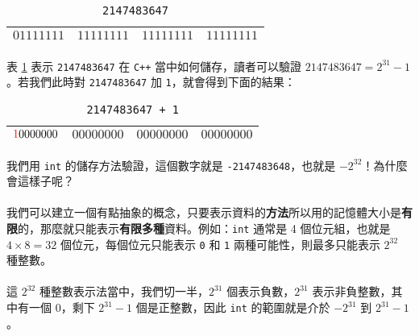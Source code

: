 \documentclass[12pt,a4paper,oneside]{article}
\begin{document}
\begin{CJK}{UTF8}{bkai}
\begin{table}[h!]
\centering
\begin{tabular}{|c|c|c|c|}
\hline
$01111111$ & $11111111$ & $11111111$ & $11111111$\\
\hline
\end{tabular}
\caption{\lstinline!2147483647!}
\label{program:struct:table:binary:2147483647}
\end{table}

\paragraph{}表 \ref{program:struct:table:binary:2147483647} 表示 \lstinline!2147483647! 在 \texttt{C++} 當中如何儲存，讀者可以驗證 $2147483647=2^{31}-1$。若我們此時對 \lstinline!2147483647! 加 \lstinline!1!，就會得到下面的結果：

\begin{table}[h!]
\centering
\begin{tabular}{|c|c|c|c|}
\hline
${\color{red}1}0000000$ & $00000000$ & $00000000$ & $00000000$\\
\hline
\end{tabular}
\caption{\lstinline!2147483647 + 1!}
\end{table}

\paragraph{}我們用 \lstinline!int! 的儲存方法驗證，這個數字就是 \lstinline!-2147483648!，也就是 $-2^{32}$！為什麼會這樣子呢？
\paragraph{}我們可以建立一個有點抽象的概念，只要表示資料的\textbf{方法}所以用的記憶體大小是\textbf{有限}的，那麼就只能表示\textbf{有限多種}資料。例如：\lstinline!int! 通常是 4 個位元組，也就是 $4\times{8}=32$ 個位元，每個位元只能表示 \lstinline!0! 和 \lstinline!1! 兩種可能性，則最多只能表示 $2^{32}$ 種整數。
\paragraph{}這 $2^{32}$ 種整數表示法當中，我們切一半，$2^{31}$ 個表示負數，$2^{31}$ 表示非負整數，其中有一個 $0$，剩下 $2^{31}-1$ 個是正整數，因此 \lstinline!int! 的範圍就是介於 $-2^{31}$ 到 $2^{31}-1$。


\end{CJK}
\end{document}
